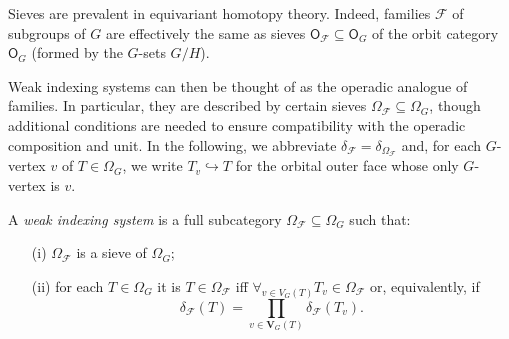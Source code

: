 \documentclass[a4paper,10pt
 ,draft
]{article}%
\begin{document}
Sieves are prevalent in equivariant homotopy theory. Indeed, families $\mathcal{F}$ of subgroups of $G$ are effectively the same as sieves $\mathsf{O}_{\mathcal{F}} \subseteq \mathsf{O}_G$
of the orbit category
$\mathsf{O}_G$ (formed by the $G$-sets $G/H$).

Weak indexing systems can then be thought of as the operadic analogue of families. In particular, they are described by certain sieves $\Omega_{\mathcal{F}} \subseteq \Omega_G$,
though additional conditions are needed to ensure compatibility with the operadic composition and unit.
In the following, we abbreviate 
$\delta_{\mathcal{F}} = \delta_{\Omega_{\mathcal{F}}}$ and,
for each $G$-vertex $v$ of $T \in \Omega_G$, we write 
$T_v \hookrightarrow T$ for the orbital outer face whose only
$G$-vertex is $v$.

\begin{definition}
A \textit{weak indexing system} is a full subcategory
$\Omega_{\mathcal{F}} \subseteq \Omega_G$ such that:
\begin{itemize}
	\item[(i)] $\Omega_{\mathcal{F}}$ is a sieve of 
              $\Omega_G$;              
	\item[(ii)] for each $T \in \Omega_G$ it is
	$T \in \Omega_{\mathcal{F}}$ iff 
	$\forall_{v \in V_G(T)} T_v \in \Omega_{\mathcal{F}}$
	or, equivalently, if
        \begin{equation}\label{SEGCOMB EQ}
              \delta_{\mathcal{F}}(T) =
              \prod_{v \in \boldsymbol{V}_G(T)}\delta_{\mathcal{F}}(T_v).
        \end{equation}
\end{itemize}
\end{definition}
\end{document}
